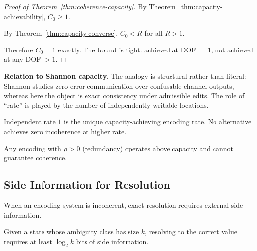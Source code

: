 \begin{proof}[Proof of Theorem~\ref{thm:coherence-capacity}]
By Theorem~\ref{thm:capacity-achievability}, $C_0 \geq 1$.

By Theorem~\ref{thm:capacity-converse}, $C_0 < R$ for all $R > 1$.

Therefore $C_0 = 1$ exactly. The bound is tight: achieved at DOF $= 1$, not achieved at any DOF $> 1$.
\end{proof}

\textbf{Relation to Shannon capacity.} The analogy is structural rather than literal: Shannon studies zero-error communication over confusable channel outputs, whereas here the object is exact consistency under admissible edits. The role of ``rate'' is played by the number of independently writable locations.

\begin{corollary}\label{cor:capacity-unique}
Independent rate $1$ is the unique capacity-achieving encoding rate. No alternative achieves zero incoherence at higher rate.
\end{corollary}

\begin{corollary}\label{cor:redundancy-above}
Any encoding with $\rho > 0$ (redundancy) operates above capacity and cannot guarantee coherence.
\end{corollary}

\subsection{Side Information for Resolution}\label{sec:side-information}

When an encoding system is incoherent, exact resolution requires external side information.

\begin{theorem}\label{thm:side-info}
Given a state whose ambiguity class has size $k$, resolving to the correct value requires at least $\log_2 k$ bits of side information.
\end{theorem}

